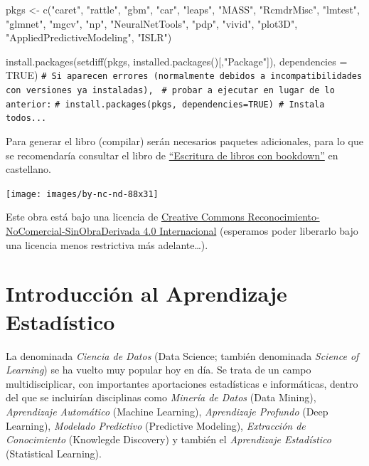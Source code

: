 \documentclass[
]{book}
\newenvironment{Shaded}{\begin{snugshade}}{\end{snugshade}}
\newcommand{\AttributeTok}[1]{\textcolor[rgb]{0.77,0.63,0.00}{#1}}
\newcommand{\CommentTok}[1]{\textcolor[rgb]{0.56,0.35,0.01}{\textit{#1}}}
\newcommand{\ConstantTok}[1]{\textcolor[rgb]{0.00,0.00,0.00}{#1}}
\newcommand{\FunctionTok}[1]{\textcolor[rgb]{0.00,0.00,0.00}{#1}}
\newcommand{\NormalTok}[1]{#1}
\newcommand{\OtherTok}[1]{\textcolor[rgb]{0.56,0.35,0.01}{#1}}
\newcommand{\StringTok}[1]{\textcolor[rgb]{0.31,0.60,0.02}{#1}}
\theoremstyle{break}
\theoremstyle{nonumberplain}
\renewcommand{\CommentTok}[1]{\textcolor[rgb]{0.41,0.41,0.41}{\texttt{#1}}}
\begin{document}
\begin{Shaded}
\begin{Highlighting}[]
\NormalTok{pkgs }\OtherTok{\textless{}{-}} \FunctionTok{c}\NormalTok{(}\StringTok{"caret"}\NormalTok{, }\StringTok{"rattle"}\NormalTok{, }\StringTok{"gbm"}\NormalTok{, }\StringTok{"car"}\NormalTok{, }\StringTok{"leaps"}\NormalTok{, }\StringTok{"MASS"}\NormalTok{, }\StringTok{"RcmdrMisc"}\NormalTok{, }
          \StringTok{"lmtest"}\NormalTok{, }\StringTok{"glmnet"}\NormalTok{, }\StringTok{"mgcv"}\NormalTok{, }\StringTok{"np"}\NormalTok{, }\StringTok{"NeuralNetTools"}\NormalTok{, }\StringTok{"pdp"}\NormalTok{, }\StringTok{"vivid"}\NormalTok{,}
          \StringTok{"plot3D"}\NormalTok{, }\StringTok{"AppliedPredictiveModeling"}\NormalTok{, }\StringTok{"ISLR"}\NormalTok{)}

\FunctionTok{install.packages}\NormalTok{(}\FunctionTok{setdiff}\NormalTok{(pkgs, }\FunctionTok{installed.packages}\NormalTok{()[,}\StringTok{"Package"}\NormalTok{]), }\AttributeTok{dependencies =} \ConstantTok{TRUE}\NormalTok{)}
\CommentTok{\# Si aparecen errores (normalmente debidos a incompatibilidades con versiones ya instaladas), }
\CommentTok{\# probar a ejecutar en lugar de lo anterior:}
\CommentTok{\# install.packages(pkgs, dependencies=TRUE) \# Instala todos...}
\end{Highlighting}
\end{Shaded}

Para generar el libro (compilar) serán necesarios paquetes adicionales,
para lo que se recomendaría consultar el libro de \href{https://rubenfcasal.github.io/bookdown_intro}{``Escritura de libros con bookdown''} en castellano.

\texttt{[image: images/by-nc-nd-88x31]}

Este obra está bajo una licencia de \href{https://creativecommons.org/licenses/by-nc-nd/4.0/deed.es_ES}{Creative Commons Reconocimiento-NoComercial-SinObraDerivada 4.0 Internacional}
(esperamos poder liberarlo bajo una licencia menos restrictiva más adelante\ldots).

\hypertarget{intro-AE}{%
\chapter{Introducción al Aprendizaje Estadístico}\label{intro-AE}}

La denominada \emph{Ciencia de Datos} (Data Science; también denominada \emph{Science of Learning}) se ha vuelto muy popular hoy en día.
Se trata de un campo multidisciplicar, con importantes aportaciones estadísticas e informáticas, dentro del que se incluirían disciplinas como \emph{Minería de Datos} (Data Mining), \emph{Aprendizaje Automático} (Machine Learning), \emph{Aprendizaje Profundo} (Deep Learning), \emph{Modelado Predictivo} (Predictive Modeling), \emph{Extracción de Conocimiento} (Knowlegde Discovery) y también el \emph{Aprendizaje Estadístico} (Statistical Learning).
\end{document}

